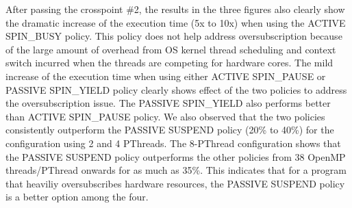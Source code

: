 After passing the crosspoint \#2, the results in the three figures also clearly show the dramatic increase 
of the execution time (5x to 10x) when using the {\sf ACTIVE SPIN\_BUSY} policy. 
This policy does not help address oversubscription because of the large amount of overhead from OS kernel thread scheduling and context switch 
incurred when the threads are competing for hardware cores. The mild increase
of the execution time when using either {\sf ACTIVE SPIN\_PAUSE} or {\sf PASSIVE SPIN\_YIELD} 
policy clearly shows effect of the two policies to address
the oversubscription issue. The {\sf PASSIVE SPIN\_YIELD} also performs better than {\sf ACTIVE SPIN\_PAUSE} policy. 
We also observed that the two policies consistently outperform the {\sf PASSIVE SUSPEND}
policy (20\% to 40\%) for the configuration using 2 and 4 PThreads. The 8-PThread configuration shows that the 
 {\sf PASSIVE SUSPEND} policy outperforms the other policies from 38 OpenMP threads/PThread onwards for as much as 35\%. 
 This indicates that for a program that heaviliy oversubscribes hardware resources, the {\sf PASSIVE SUSPEND} 
 policy is a better option among the four.

